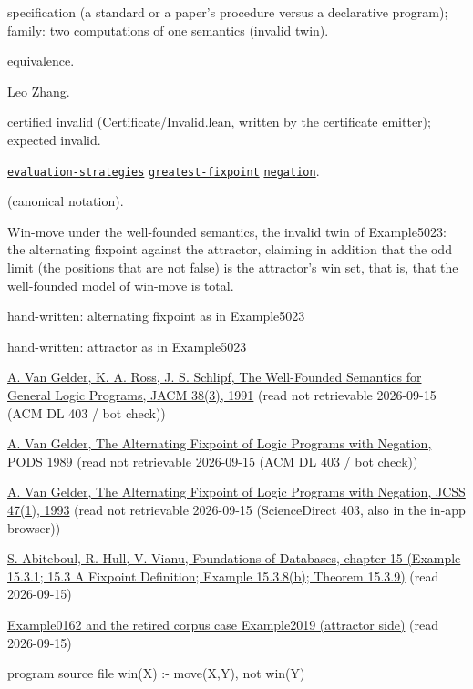 \documentclass[10pt]{article}
\begin{document}
\begin{description}[leftmargin=2.6cm,style=nextline,itemsep=1pt]

\item[Category] specification (a standard or a paper's procedure versus a declarative program); family: two computations of one semantics (invalid twin).

\item[Kind] equivalence.

\item[Contributors] Leo Zhang.

\item[Status] certified invalid (Certificate/Invalid.lean, written by the certificate emitter); expected invalid.

\item[Tags] \hyperref[tag:evaluation-strategies]{\texttt{evaluation-strategies}} \hyperref[tag:greatest-fixpoint]{\texttt{greatest-fixpoint}} \hyperref[tag:negation]{\texttt{negation}}.

\item[Input]  (canonical notation).

\item[Summary] Win-move under the well-founded semantics, the invalid twin of Example5023: the alternating fixpoint against the attractor, claiming in addition that the odd limit (the positions that are not false) is the attractor's win set, that is, that the well-founded model of win-move is total.

\item[Sides] hand-written: alternating fixpoint as in Example5023 \par hand-written: attractor as in Example5023

\item[Sources] {\raggedright \href{https://doi.org/10.1145/116825.116838}{A. Van Gelder, K. A. Ross, J. S. Schlipf, The Well-Founded Semantics for General Logic Programs, JACM 38(3), 1991} (read not retrievable 2026-09-15 (ACM DL 403 / bot check)) \par \href{https://doi.org/10.1145/73721.73722}{A. Van Gelder, The Alternating Fixpoint of Logic Programs with Negation, PODS 1989} (read not retrievable 2026-09-15 (ACM DL 403 / bot check)) \par \href{https://doi.org/10.1016/0022-0000(93)90024-Q}{A. Van Gelder, The Alternating Fixpoint of Logic Programs with Negation, JCSS 47(1), 1993} (read not retrievable 2026-09-15 (ScienceDirect 403, also in the in-app browser)) \par \href{http://webdam.inria.fr/Alice/pdfs/Chapter-15.pdf}{S. Abiteboul, R. Hull, V. Vianu, Foundations of Databases, chapter 15 (Example 15.3.1; 15.3 A Fixpoint Definition; Example 15.3.8(b); Theorem 15.3.9)} (read 2026-09-15) \par \href{local}{Example0162 and the retired corpus case Example2019 (attractor side)} (read 2026-09-15) \par program source file win(X) :- move(X,Y), not win(Y)\par}


\end{description}
\end{document}
